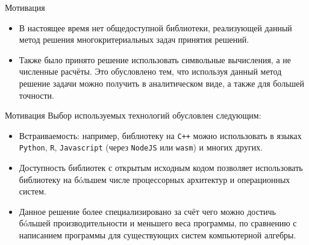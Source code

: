 \documentclass[11pt]{beamer}
\begin{document}

\begin{frame}{Мотивация}
	\begin{itemize}
	\item В настоящее время нет общедоступной библиотеки, реализующей данный метод решения многокритериальных задач принятия решений.
	
	\item Также было принято решение использовать символьные вычисления, а не численные расчёты. Это обусловлено тем, что используя данный метод решение задачи можно получить в аналитическом виде, а также для большей точности.
	\end{itemize}
\end{frame}

\begin{frame}{Мотивация}
  Выбор используемых технологий обусловлен следующим:
	\begin{itemize}
    \item Встраиваемость: например, библиотеку на \texttt{C++} можно использовать в языках \texttt{Python}, \texttt{R}, \texttt{Javascript} (через \texttt{NodeJS} или \texttt{wasm}) и многих других.
    \item Доступность библиотек с открытым исходным кодом позволяет использовать библиотеку на бóльшем числе процессорных архитектур и операционных систем.
    \item Данное решение более специализировано за счёт чего можно достичь бóльшей производительности и меньшего веса программы, по сравнению с написанием программы для существующих систем компьютерной алгебры.
	\end{itemize}
\end{frame}
\end{document}
